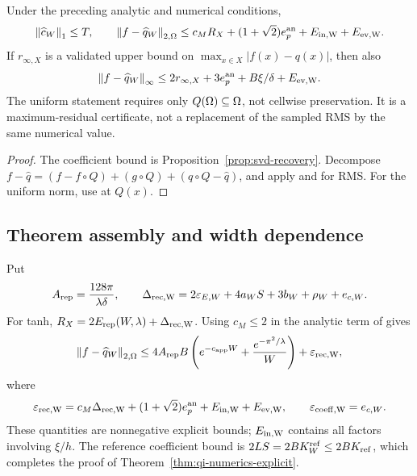\begin{theorem}
\label{thm:computed}
Under the preceding analytic and numerical conditions,
\begin{equation}
 \left\lVert \widehat c_W\right\rVert_1\le T,\qquad
 \left\lVert f-\widehat q_W\right\rVert_{2,\Omega}
 \le c_M R_X+(1+\sqrt2)e_p^{\rm an}+E_{\rm in,W}+E_{\rm ev,W}.
 \label{eq:computed-rms}
\end{equation}
If $r_{\infty,X}$ is a validated upper bound on
$\max_{x\in X}|f(x)-q(x)|$, then also
\begin{equation}
 \left\lVert f-\widehat q_W\right\rVert_\infty
 \le2r_{\infty,X}+3e_p^{\rm an}+B\xi/\delta+E_{\rm ev,W}.
 \label{eq:computed-uniform}
\end{equation}
The uniform statement requires only $Q(\Omega)\subseteq\Omega$, not cellwise
preservation. It is a maximum-residual certificate, not a replacement of the
sampled RMS by the same numerical value.
\end{theorem}
\begin{proof}
The coefficient bound is Proposition~\ref{prop:svd-recovery}.
Decompose $f-\widehat q=(f-f\circ Q)+(g\circ Q)+(q\circ Q-\widehat q)$,
and apply  and  for RMS.
For the uniform norm, use  at $Q(x)$.
\end{proof}

\subsection{Theorem assembly and width dependence}
\label{sec:assemble}
Put
\begin{equation}
 A_{\rm rep}=\frac{128\pi}{\lambda\delta},\qquad
 \Delta_{\rm rec,W}=2\varepsilon_{E,W}+4a_WS+3b_W+\rho_W+e_{c,W}.
 \label{eq:Arep}
\end{equation}
For tanh, $R_X=2E_{\mathrm{rep}}(W,\lambda)+\Delta_{\rm rec,W}$.
Using $c_M\le2$ in the analytic term of  gives
\begin{equation}
 \left\lVert f-\widehat q_W\right\rVert_{2,\Omega}
 \le4A_{\rm rep}B\left(e^{-c_{\mathrm{app}} W}+\frac{e^{-\pi^2/\lambda}}W\right)
       +\varepsilon_{\rm rec,W},
 \label{eq:final-decomp}
\end{equation}
where
\begin{equation}
 \varepsilon_{\rm rec,W}=c_M\Delta_{\rm rec,W}
 +(1+\sqrt2)e_p^{\rm an}+E_{\rm in,W}+E_{\rm ev,W},
 \qquad \varepsilon_{\rm coeff,W}=e_{c,W}.
 \label{eq:epsrec}
\end{equation}
These quantities are nonnegative explicit bounds; $E_{\rm in,W}$ contains
all factors involving $\xi/h$. The reference coefficient bound is
$2LS=2B K_W^{\rm ref}\le2BK_{\rm ref}$, which completes the proof of
Theorem~\ref{thm:qi-numerics-explicit}.

